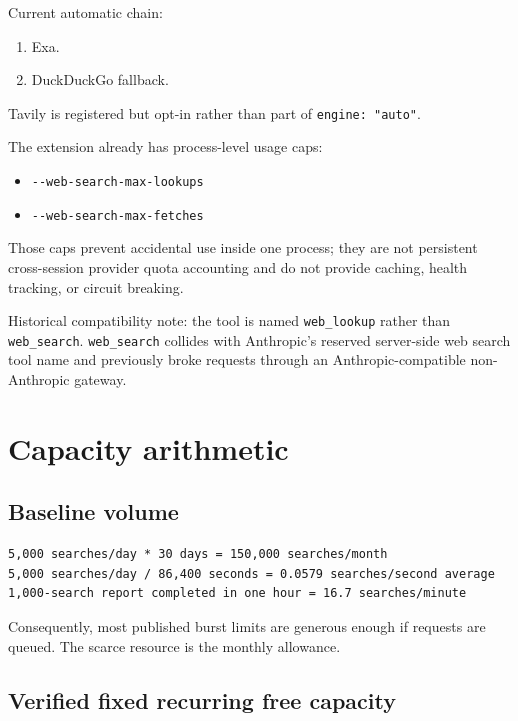 \documentclass[11pt]{article}
\begin{document}
Current automatic chain:

\begin{enumerate}
\item Exa.
\item DuckDuckGo fallback.
\end{enumerate}

Tavily is registered but opt-in rather than part of \texttt{engine: "auto"}.

The extension already has process-level usage caps:

\begin{itemize}
\item \texttt{-{}-{}web-search-max-lookups}
\item \texttt{-{}-{}web-search-max-fetches}
\end{itemize}

Those caps prevent accidental use inside one process; they are not persistent
cross-session provider quota accounting and do not provide caching, health
tracking, or circuit breaking.

Historical compatibility note: the tool is named \texttt{web\_lookup} rather than
\texttt{web\_search}.  \texttt{web\_search} collides with Anthropic's reserved server-side web
search tool name and previously broke requests through an Anthropic-compatible
non-Anthropic gateway.
\section*{Capacity arithmetic}
\label{sec:orgd420882}

\subsection*{Baseline volume}
\label{sec:orgfb27f55}

\begin{verbatim}
5,000 searches/day * 30 days = 150,000 searches/month
5,000 searches/day / 86,400 seconds = 0.0579 searches/second average
1,000-search report completed in one hour = 16.7 searches/minute
\end{verbatim}

Consequently, most published burst limits are generous enough if requests are
queued.  The scarce resource is the monthly allowance.
\subsection*{Verified fixed recurring free capacity}
\label{sec:org41f4cf1}
\end{document}
